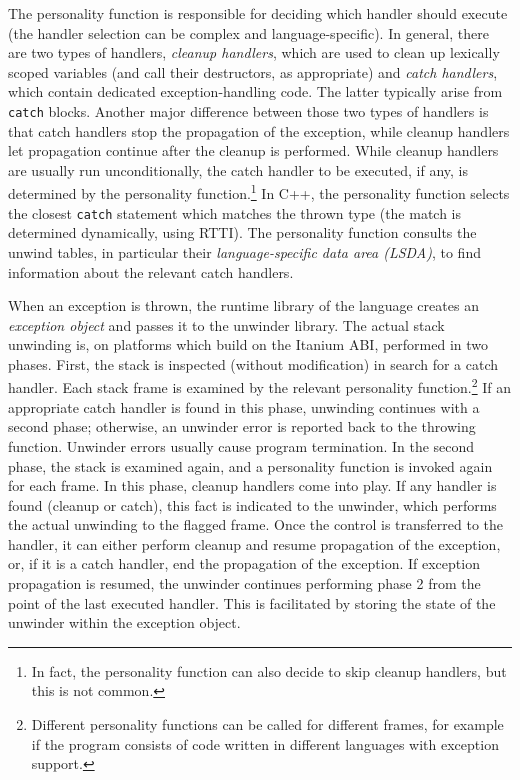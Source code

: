 The personality function is responsible for deciding which handler
should execute (the handler selection can be complex and
language-specific). In general, there are two types of handlers,
\emph{cleanup handlers}, which are used to clean up lexically scoped
variables (and call their destructors, as appropriate) and \emph{catch
handlers}, which contain dedicated exception-handling code. The latter
typically arise from \texttt{catch} blocks. Another major difference
between those two types of handlers is that catch handlers stop the
propagation of the exception, while cleanup handlers let propagation
continue after the cleanup is performed. While cleanup handlers are
usually run unconditionally, the catch handler to be executed, if any,
is determined by the personality function.\footnote{In fact, the
  personality function can also decide to skip cleanup handlers, but
  this is not common.} In C++, the personality function selects the
closest \texttt{catch} statement which matches the thrown type (the
match is determined dynamically, using RTTI). The personality function
consults the unwind tables, in particular their \emph{language-specific
data area (LSDA)}, to find information about the relevant catch
handlers.

When an exception is thrown, the runtime library of the language creates
an \emph{exception object} and passes it to the unwinder library. The
actual stack unwinding is, on platforms which build on the Itanium ABI,
performed in two phases. First, the stack is inspected (without
modification) in search for a catch handler. Each stack frame is
examined by the relevant personality function.\footnote{Different
  personality functions can be called for different frames, for example
  if the program consists of code written in different languages with
  exception support.} If an appropriate catch handler is found in this
phase, unwinding continues with a second phase; otherwise, an unwinder
error is reported back to the throwing function. Unwinder errors usually
cause program termination. In the second phase, the stack is examined
again, and a personality function is invoked again for each frame. In
this phase, cleanup handlers come into play. If any handler is found
(cleanup or catch), this fact is indicated to the unwinder, which
performs the actual unwinding to the flagged frame. Once the control is
transferred to the handler, it can either perform cleanup and resume
propagation of the exception, or, if it is a catch handler, end the
propagation of the exception. If exception propagation is resumed, the
unwinder continues performing phase 2 from the point of the last
executed handler. This is facilitated by storing the state of the
unwinder within the exception object.

